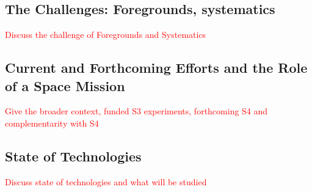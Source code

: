 \documentclass[12pt]{article}
\newcommand{\comred}[1]{\textcolor{red}{#1}}
\begin{document}
\subsection{The Challenges: Foregrounds, systematics}
\label{sec:foregrounds}

\vspace{-0.05in}

\comred{Discuss the challenge of Foregrounds and Systematics}

\subsection{Current and Forthcoming Efforts and the Role of a Space Mission}
\label{sec:spacemission}

\vspace{-0.05in}

\comred{Give the broader context, funded S3 experiments, forthcoming S4 and complementarity with S4}

\vspace{-0.22in}

\subsection{State of Technologies}
\label{sec:technologies}

\vspace{-0.05in}

\comred{Discuss state of technologies and what will be studied}
\end{document}
